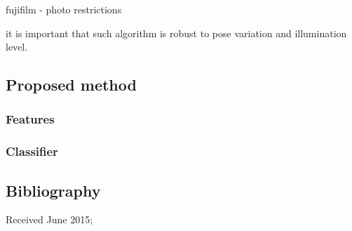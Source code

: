\documentclass[hyperref]{acmtrans2e}
\begin{document}
fujifilm - photo restrictions

it is important that such algorithm is robust to pose variation and illumination level.
\subsection{Proposed method}
\subsubsection{Features}
\subsubsection{Classifier}

\subsection{Bibliography}


\begin{received}
Received June 2015;
\end{received}
\end{document}
